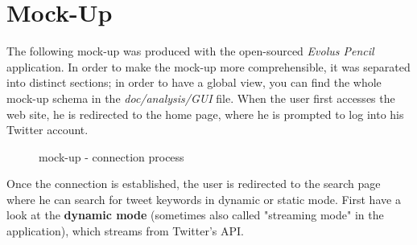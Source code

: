 \documentclass[a4paper,11pt]{report}
\begin{document}
\section{Mock-Up}
The following mock-up was produced with the open-sourced \emph{Evolus Pencil} application. In order to make the mock-up more comprehensible, it was separated into distinct sections; in order to have a global view, you can find the whole mock-up schema in the \emph{doc/analysis/GUI} file.
When the user first accesses the web site, he is redirected to the home page, where he is prompted to log into his Twitter account.
\begin{figure}[H]
\begin{center}
\vspace{-20pt}
\caption{mock-up - connection process}
\end{center}
\end{figure}
\newpage
\vspace*{\fill}
Once the connection is established, the user is redirected to the search page where he can search for tweet keywords in dynamic or static mode. First have a look at the \textbf{dynamic mode} (sometimes also called "streaming mode" in the application), which streams from Twitter's API.
\bigskip
\end{document}
